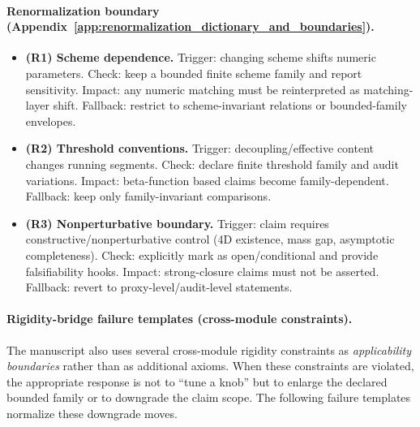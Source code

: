 \paragraph{Renormalization boundary (Appendix~\ref{app:renormalization_dictionary_and_boundaries}).}
\begin{itemize}
\item \textbf{(R1) Scheme dependence.}
  Trigger: changing scheme shifts numeric parameters.
  Check: keep a bounded finite scheme family and report sensitivity.
  Impact: any numeric matching must be reinterpreted as matching-layer shift.
  Fallback: restrict to scheme-invariant relations or bounded-family envelopes.
\item \textbf{(R2) Threshold conventions.}
  Trigger: decoupling/effective content changes running segments.
  Check: declare finite threshold family and audit variations.
  Impact: beta-function based claims become family-dependent.
  Fallback: keep only family-invariant comparisons.
\item \textbf{(R3) Nonperturbative boundary.}
  Trigger: claim requires constructive/nonperturbative control (4D existence, mass gap, asymptotic completeness).
  Check: explicitly mark as open/conditional and provide falsifiability hooks.
  Impact: strong-closure claims must not be asserted.
  Fallback: revert to proxy-level/audit-level statements.
\end{itemize}

\paragraph{Rigidity-bridge failure templates (cross-module constraints).}
\AuditTag The manuscript also uses several cross-module rigidity constraints as \emph{applicability boundaries} rather than as additional axioms.
When these constraints are violated, the appropriate response is not to ``tune a knob'' but to enlarge the declared bounded family or to downgrade the claim scope.
The following failure templates normalize these downgrade moves.

